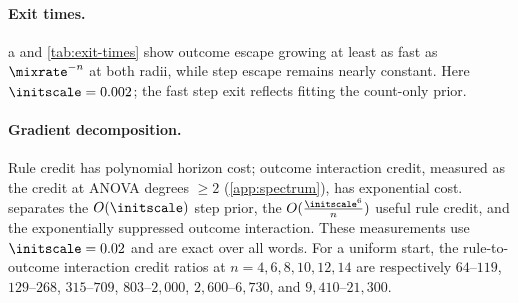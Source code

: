 \paragraph{Exit times.} a and \cref{tab:exit-times} show outcome escape growing at least as fast as
$\mixrate^{-n}$ at both radii, while step escape remains nearly constant. Here $\initscale=0.002$; the fast step exit reflects fitting the
count-only prior.

\begin{table}[H]
\centering\small
{}
\caption{\textbf{Outcome escape grows exponentially while step escape stays nearly constant.} $\initscale=0.002$, zero readout;
ranges are over three draws.}
\label{tab:exit-times}
\end{table}
\paragraph{Gradient decomposition.} Rule credit has polynomial horizon cost; outcome interaction credit, measured as the credit at ANOVA degrees $\ge2$ (\cref{app:spectrum}), has exponential cost.
 separates the $O(\initscale)$ step prior, the $O(\frac{\initscale^6}{n})$ useful rule credit, and the exponentially
suppressed outcome interaction. These measurements use $\initscale=0.02$ and are exact over all words.
For a uniform start, the rule-to-outcome interaction credit ratios at $n=4,6,8,10,12,14$ are respectively
$64$--$119$, $129$--$268$, $315$--$709$, $803$--$2{,}000$, $2{,}600$--$6{,}730$, and $9{,}410$--$21{,}300$.

